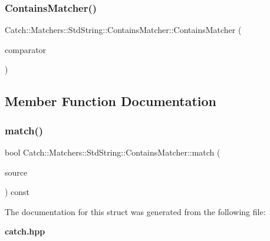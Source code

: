 \subsubsection{ContainsMatcher()}
{\footnotesize\ttfamily Catch\+::\+Matchers\+::\+Std\+String\+::\+Contains\+Matcher\+::\+Contains\+Matcher (\begin{DoxyParamCaption}\item[{\textbf{ Cased\+String} const \&}]{comparator }\end{DoxyParamCaption})}



\subsection{Member Function Documentation}
\mbox{\label{struct_catch_1_1_matchers_1_1_std_string_1_1_contains_matcher_a630628b234b037be83fe587081a80b53}} 
\subsubsection{match()}
{\footnotesize\ttfamily bool Catch\+::\+Matchers\+::\+Std\+String\+::\+Contains\+Matcher\+::match (\begin{DoxyParamCaption}\item[{std\+::string const \&}]{source }\end{DoxyParamCaption}) const\hspace{0.3cm}{\ttfamily [override]}}



The documentation for this struct was generated from the following file\+:\begin{DoxyCompactItemize}
\item 
\textbf{ catch.\+hpp}\end{DoxyCompactItemize}
